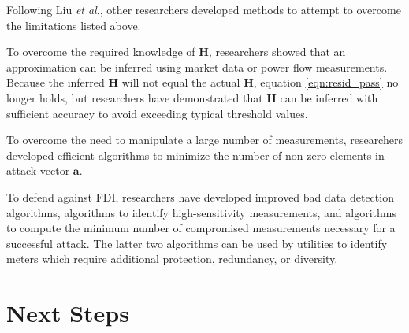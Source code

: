 \documentclass{article}
\begin{document}
Following Liu \textit{et al}., other researchers developed methods to attempt to overcome the limitations listed above.

To overcome the required knowledge of $\mathbf{H}$, researchers showed that an approximation can be inferred using market data or power flow measurements.  Because the inferred $\mathbf{H}$ will not equal the actual $\mathbf{H}$, equation \eqref{eqn:resid_pass} no longer holds, but researchers have demonstrated that $\mathbf{H}$ can be inferred with sufficient accuracy to avoid exceeding typical threshold values.

To overcome the need to manipulate a large number of measurements, researchers developed efficient algorithms to minimize the number of non-zero elements in attack vector $\mathbf{a}$.

To defend against FDI, researchers have developed improved bad data detection algorithms, algorithms to identify high-sensitivity measurements, and algorithms to compute the minimum number of compromised measurements necessary for a successful attack.  The latter two algorithms can be used by utilities to identify meters which require additional protection, redundancy, or diversity.

\section{Next Steps}
\end{document}
